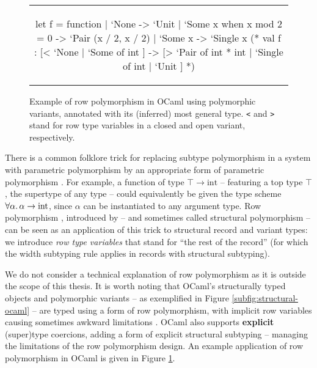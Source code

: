 \begin{figure}
    \centering
    \begin{tabular}{c}
    \begin{ocaml}
let f = function 
    | `None -> `Unit 
    | `Some x when x mod 2 = 0 -> `Pair (x / 2, x / 2) 
    | `Some x -> `Single x
(* 
val f : [< `None | `Some of int ] 
     -> [> `Pair of int * int | `Single of int | `Unit ]
*)
    \end{ocaml}
    \end{tabular}
    \caption{Example of row polymorphism in OCaml using polymorphic variants, annotated with its (inferred) most general type. \texttt{<} and \texttt{>} stand for row type variables in a closed and open variant, respectively.}
    \label{fig:ocaml-row-polymorphism}
\end{figure}

There is a common folklore trick for replacing subtype polymorphism in a system with parametric polymorphism by an appropriate form of parametric polymorphism \cite{structural-subtyping-as-parameric-polymorphism}. For example, a function of type $\top \to \mathrm{int}$ -- featuring a top type $\top$, the supertype of any type -- could equivalently be given the type scheme $\forall \alpha \ldotp \alpha \to \mathrm{int}$, since $\alpha$ can be instantiated to any argument type.
Row polymorphism \cite{remy-records}, introduced by \textcite{wand-rows} -- and sometimes called structural polymorphism \cite{simple-structural-polymorphism} -- can be seen as an application of this trick to structural record and variant types: we introduce \emph{row type variables} that stand for \enquote{the rest of the record} (for which the width subtyping rule applies in records with structural subtyping).

We do not consider a technical explanation of row polymorphism as it is outside the scope of this thesis. It is worth noting that OCaml's structurally typed objects \cite{objective-ml} and polymorphic variants \cite{polymorphic-variants} -- as exemplified in Figure \ref{subfig:structural-ocaml} -- are typed using a form of row polymorphism, with implicit row variables \cite{objective-ml} causing sometimes awkward limitations \cite{castagna-polymorphic-variants}. OCaml also supports \textbf{explicit} (super)type coercions, adding a form of explicit structural subtyping -- managing the limitations of the row polymorphism design. 
An example application of row polymorphism in OCaml is given in Figure \ref{fig:ocaml-row-polymorphism}.

